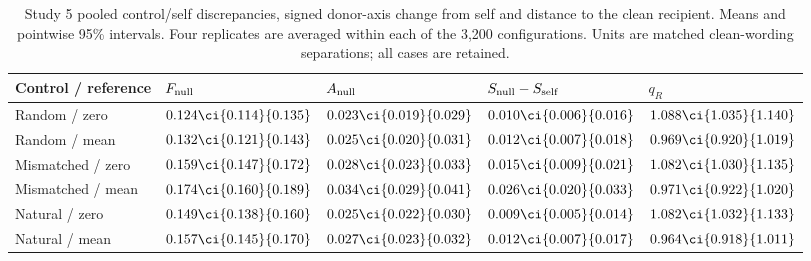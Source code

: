 \begin{table}[H]
\centering\footnotesize
\setlength{\tabcolsep}{3pt}
\caption{Study 5 pooled control/self discrepancies, signed donor-axis change from self and distance to the clean recipient. Means and pointwise 95\% intervals. Four replicates are averaged within each of the 3,200 configurations. Units are matched clean-wording separations; all cases are retained.}
\label{tab:null-means}
\begin{tabularx}{\linewidth}{@{}lYYYY@{}}
\toprule
Control / reference & $F_{\rm null}$ & $A_{\rm null}$ & $S_{\rm null}-S_{\rm self}$ & $q_R$ \\
\midrule
Random / zero & $0.124\ci{0.114}{0.135}$ & $0.023\ci{0.019}{0.029}$ & $0.010\ci{0.006}{0.016}$ & $1.088\ci{1.035}{1.140}$ \\
Random / mean & $0.132\ci{0.121}{0.143}$ & $0.025\ci{0.020}{0.031}$ & $0.012\ci{0.007}{0.018}$ & $0.969\ci{0.920}{1.019}$ \\
Mismatched / zero & $0.159\ci{0.147}{0.172}$ & $0.028\ci{0.023}{0.033}$ & $0.015\ci{0.009}{0.021}$ & $1.082\ci{1.030}{1.135}$ \\
Mismatched / mean & $0.174\ci{0.160}{0.189}$ & $0.034\ci{0.029}{0.041}$ & $0.026\ci{0.020}{0.033}$ & $0.971\ci{0.922}{1.020}$ \\
Natural / zero & $0.149\ci{0.138}{0.160}$ & $0.025\ci{0.022}{0.030}$ & $0.009\ci{0.005}{0.014}$ & $1.082\ci{1.032}{1.133}$ \\
Natural / mean & $0.157\ci{0.145}{0.170}$ & $0.027\ci{0.023}{0.032}$ & $0.012\ci{0.007}{0.017}$ & $0.964\ci{0.918}{1.011}$ \\
\bottomrule
\end{tabularx}
\end{table}

